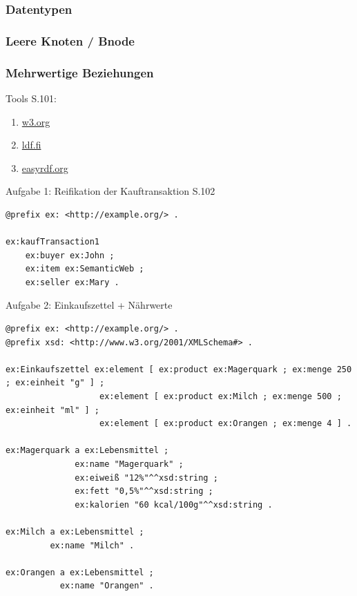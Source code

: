 \documentclass[a4paper]{article}
\begin{document}
\subsubsection{Datentypen}


\subsubsection{Leere Knoten / Bnode}



\subsubsection{Mehrwertige Beziehungen}


Tools S.101:

\begin{enumerate}
    \item \href{https://www.w3.org/RDF/Validator/}{w3.org}
    \item \href{http://www.ldf.fi/service/rdf-grapher}{ldf.fi}
    \item \href{https://www.easyrdf.org/converter}{easyrdf.org}
\end{enumerate}

Aufgabe 1: Reifikation der Kauftransaktion S.102

\begin{lstlisting}
@prefix ex: <http://example.org/> .

ex:kaufTransaction1
    ex:buyer ex:John ;
    ex:item ex:SemanticWeb ;
    ex:seller ex:Mary .
\end{lstlisting}

Aufgabe 2: Einkaufszettel + Nährwerte

\begin{lstlisting}
@prefix ex: <http://example.org/> .
@prefix xsd: <http://www.w3.org/2001/XMLSchema#> .

ex:Einkaufszettel ex:element [ ex:product ex:Magerquark ; ex:menge 250 ; ex:einheit "g" ] ;
                   ex:element [ ex:product ex:Milch ; ex:menge 500 ; ex:einheit "ml" ] ;
                   ex:element [ ex:product ex:Orangen ; ex:menge 4 ] .

ex:Magerquark a ex:Lebensmittel ;
              ex:name "Magerquark" ;
              ex:eiweiß "12%"^^xsd:string ;
              ex:fett "0,5%"^^xsd:string ;
              ex:kalorien "60 kcal/100g"^^xsd:string .

ex:Milch a ex:Lebensmittel ;
         ex:name "Milch" .

ex:Orangen a ex:Lebensmittel ;
           ex:name "Orangen" .
\end{lstlisting}
\end{document}

